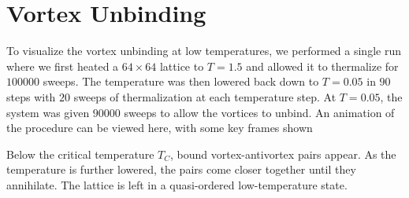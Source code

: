 \section{Vortex Unbinding}\label{sec:vortex_unbinding}
	To visualize the vortex unbinding at low temperatures, we performed a single run where we first heated a $64 \times 64$ lattice  to $T = \num{1.5}$ and allowed it to thermalize for $\num{100 000}$ sweeps. The temperature was then lowered back down to $T = \num{0.05}$ in $90$ steps with $20$ sweeps of thermalization at each temperature step. At $T = \num{0.05}$, the system was given $\num{90 000}$ sweeps to allow the vortices to unbind. An animation of the procedure can be viewed here, with some key frames shown  
	
	Below the critical temperature $T_C$, bound vortex-antivortex pairs appear. As the temperature is further lowered, the pairs come closer together until they annihilate. The lattice is left in a quasi-ordered low-temperature state.